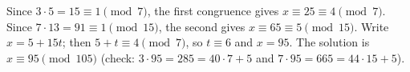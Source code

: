 Since $3\cdot5=15\equiv1\pmod7$, the first congruence gives $x\equiv25\equiv4\pmod7$. Since $7\cdot13=91\equiv1\pmod{15}$, the second gives $x\equiv65\equiv5\pmod{15}$. Write $x=5+15t$; then $5+t\equiv4\pmod7$, so $t\equiv6$ and $x=95$. The solution is $\boxed{x\equiv95\pmod{105}}$ (check: $3\cdot95=285=40\cdot7+5$ and $7\cdot95=665=44\cdot15+5$).
